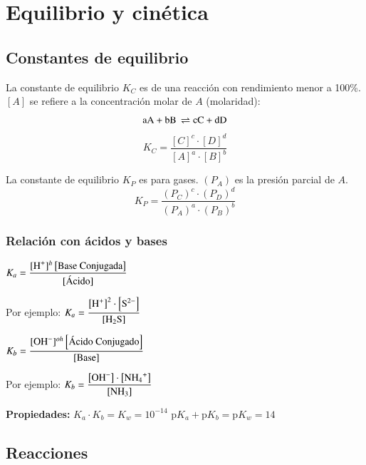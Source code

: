 \section{Equilibrio y cinética}

\subsection*{Constantes de equilibrio}

La constante de equilibrio $K_C$ es de una reacción con rendimiento menor a 100\%. $[A]$ se refiere a la concentración molar de $A$ (molaridad):
$$\ce{
aA + bB \rightleftharpoons cC + dD
}$$
$$
K_C = \dfrac{[C]^c \cdot [D]^d}{[A]^a\cdot [B]^b}
$$

La constante de equilibrio $K_P$ es para gases. $(P_A)$ es la presión parcial de $A$.
$$
K_P = \dfrac{(P_C)^c \cdot (P_D)^d}{(P_A)^a \cdot (P_B)^b}
$$


\subsubsection*{Relación con ácidos y bases}

\begin{multicols}{2}
    \hfil
    $K_a = \dfrac{[\ce{H^+}]^{h}\left[\text{Base Conjugada}\right]}{[\text{Ácido}]}$
    \hfil

    \columnbreak

    Por ejemplo:
    \hfil
    $K_a = \dfrac{ \left[\ce{H^+}\right]^{2} \cdot \left[\ce{S^{2-}}\right]}
    {\left[ \ce{H2S} \right]}$
    \hfil
\end{multicols}


\begin{multicols}{2}
    \hfil
    $K_b = \dfrac{[\ce{OH^-}]^{oh}\left[\text{Ácido Conjugado}\right]}{[\text{Base}]}$
    \hfil
    
    \columnbreak
    
    Por ejemplo:
    \hfil
    $K_b = \dfrac{ \left[\ce{OH^-}\right] \cdot \left[\ce{NH4^{+}}\right]}
    {\left[ \ce{NH3} \right]}$
    \hfil
\end{multicols}

\vspace{\baselineskip}
\noindent
\textbf{Propiedades:}
\hfil
$K_a \cdot K_b = K_w = 10^{-14}$
\hfil
$\text{p}K_a + \text{p}K_b = \text{p}K_w = 14$
\hfil




\subsection*{Reacciones}

